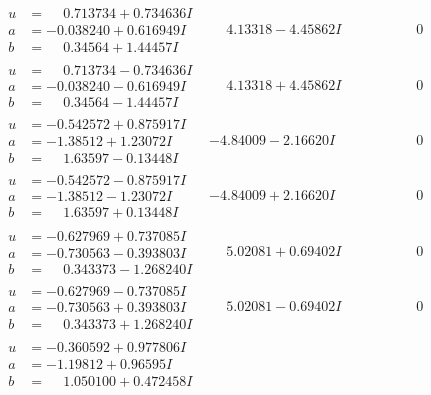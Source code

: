 \documentclass[1p]{elsarticle_modified}
\theoremstyle{definition}
\begin{document}
$$\begin{array}{c|c|c}
\begin{aligned}
u &= \phantom{-}0.713734 + 0.734636 I \\
a &= -0.038240 + 0.616949 I \\
b &= \phantom{-}0.34564 + 1.44457 I\end{aligned}
 & \phantom{-}4.13318 - 4.45862 I & \phantom{-0.000000 } 0 \\ \hline\begin{aligned}
u &= \phantom{-}0.713734 - 0.734636 I \\
a &= -0.038240 - 0.616949 I \\
b &= \phantom{-}0.34564 - 1.44457 I\end{aligned}
 & \phantom{-}4.13318 + 4.45862 I & \phantom{-0.000000 } 0 \\ \hline\begin{aligned}
u &= -0.542572 + 0.875917 I \\
a &= -1.38512 + 1.23072 I \\
b &= \phantom{-}1.63597 - 0.13448 I\end{aligned}
 & -4.84009 - 2.16620 I & \phantom{-0.000000 } 0 \\ \hline\begin{aligned}
u &= -0.542572 - 0.875917 I \\
a &= -1.38512 - 1.23072 I \\
b &= \phantom{-}1.63597 + 0.13448 I\end{aligned}
 & -4.84009 + 2.16620 I & \phantom{-0.000000 } 0 \\ \hline\begin{aligned}
u &= -0.627969 + 0.737085 I \\
a &= -0.730563 - 0.393803 I \\
b &= \phantom{-}0.343373 - 1.268240 I\end{aligned}
 & \phantom{-}5.02081 + 0.69402 I & \phantom{-0.000000 } 0 \\ \hline\begin{aligned}
u &= -0.627969 - 0.737085 I \\
a &= -0.730563 + 0.393803 I \\
b &= \phantom{-}0.343373 + 1.268240 I\end{aligned}
 & \phantom{-}5.02081 - 0.69402 I & \phantom{-0.000000 } 0 \\ \hline\begin{aligned}
u &= -0.360592 + 0.977806 I \\
a &= -1.19812 + 0.96595 I \\
b &= \phantom{-}1.050100 + 0.472458 I\end{aligned}

\end{array}$$
\end{document}
